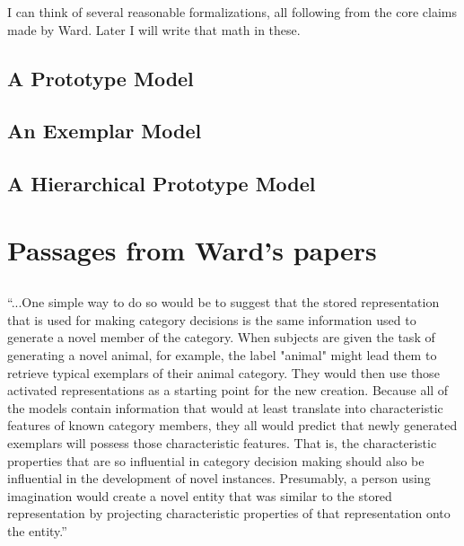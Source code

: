 \documentclass[12pt]{article}
\begin{document}
I can think of several reasonable formalizations, all following from the core claims made by Ward. Later I will write that math in these.

\subsection{A Prototype Model}

\subsection{An Exemplar Model}

\subsection{A Hierarchical Prototype Model}


\clearpage




\clearpage
\appendix
\section{Passages from Ward's papers}
\label{ap:passages}

\subsection{\cite{ward1994structured}}
\begin{displayquote}
``...One simple way to do so would be to suggest that the stored representation that is used for making category decisions is the same information used to generate a novel member of the category. When subjects are given the task of generating a novel animal, for example, the label "animal" might lead them to retrieve typical exemplars of their animal category. They would then use those activated representations as a starting point for the new creation. Because all of the models contain information that would at least translate into characteristic features of known category members, they all would predict that newly generated exemplars will possess those characteristic features. That is, the characteristic properties that are so influential in category decision making should also be influential in the development of novel instances. Presumably, a person using imagination would create a novel entity that was similar to the stored representation by projecting characteristic properties of that representation onto the entity.''
\end{displayquote}
\end{document}
